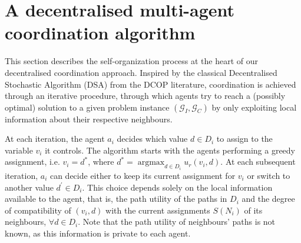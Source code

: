 \section{A decentralised multi-agent coordination algorithm}\label{sec:consensus}

This section describes the self-organization process at the heart of our decentralised coordination approach. 
Inspired by the classical Decentralised Stochastic Algorithm (DSA) \cite{fitzpatrick2003distributed} from the DCOP literature, coordination is achieved through an iterative procedure, through which agents try to reach a (possibly optimal) solution to a given problem instance $(\mathcal{G}_I, \mathcal{G}_C)$ by only exploiting local information about their respective neighbours. 

At each iteration, the agent $a_i$ decides which value $d \in D_i$ to assign to the variable $v_i$ it controls. The algorithm starts with the agents performing a greedy assignment, i.e. $v_i=d^*$, where $d^* = \operatorname{argmax}_{d \in D_i} u_r(v_i,d)$. At each subsequent iteration, $a_i$ can decide either to keep its current assignment for $v_i$ or switch to another value $d^{\prime} \in D_i$. This choice depends solely on the local information available to the agent, that is, the path utility of the paths in $D_i$ and the degree of compatibility of $(v_i, d)$ with the current assignments $S(N_i)$ of its neighbours, $\forall d \in D_i$. 
Note that the path utility of neighbours' paths is not known, as this information is private to each agent.

